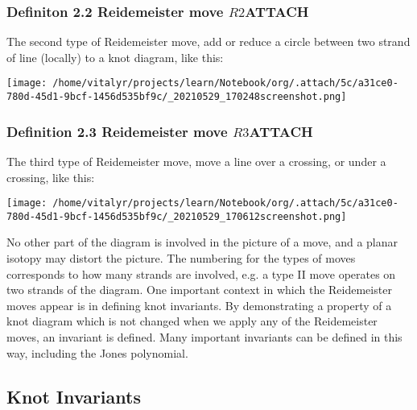 \documentclass[a4paper]{article}
\begin{document}
\subsubsection{Definiton 2.2 Reidemeister move \(R2\)\hfill{}\textsc{ATTACH}}
\label{sec:org6883a35}
The second type of Reidemeister move, add or reduce a circle between two strand of line (locally) to a knot diagram, like this:

\begin{center}
\texttt{[image: /home/vitalyr/projects/learn/Notebook/org/.attach/5c/a31ce0-780d-45d1-9bcf-1456d535bf9c/\_20210529\_170248screenshot.png]}
\end{center}

\subsubsection{Definition 2.3 Reidemeister move \(R3\)\hfill{}\textsc{ATTACH}}
\label{sec:org0c11008}
The third type of Reidemeister move, move a  line over a crossing, or under a crossing, like this:

\begin{center}
\texttt{[image: /home/vitalyr/projects/learn/Notebook/org/.attach/5c/a31ce0-780d-45d1-9bcf-1456d535bf9c/\_20210529\_170612screenshot.png]}
\end{center}

No other part of the diagram is involved in the picture of a move, and a planar isotopy may distort the picture. The numbering for the types of moves corresponds to how many strands are involved, e.g. a type II move operates on two strands of the diagram.
One important context in which the Reidemeister moves appear is in defining knot invariants. By demonstrating a property of a knot diagram which is not changed when we apply any of the Reidemeister moves, an invariant is defined. Many important invariants can be defined in this way, including the Jones polynomial.
\subsection{Knot Invariants}
\label{sec:org465d285}
\end{document}
